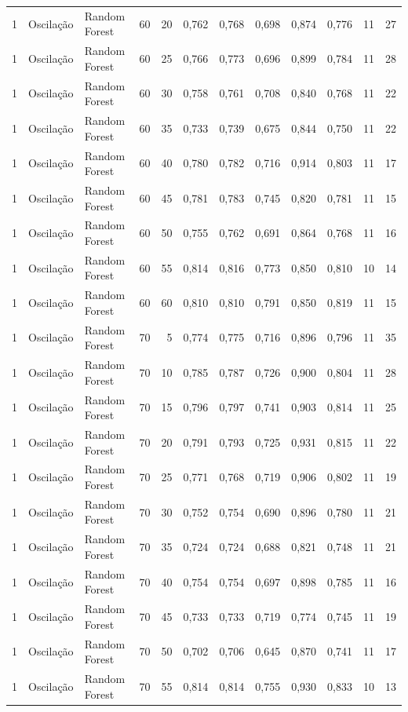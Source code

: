 \begin{longtable}{@{}rllrrrrrrrrr@{}}
1 & Oscilação & Random Forest & 60 & 20 & 0,762 & 0,768 & 0,698 & 0,874 & 0,776 & 11 & 27 \\
1 & Oscilação & Random Forest & 60 & 25 & 0,766 & 0,773 & 0,696 & 0,899 & 0,784 & 11 & 28 \\
1 & Oscilação & Random Forest & 60 & 30 & 0,758 & 0,761 & 0,708 & 0,840 & 0,768 & 11 & 22 \\
1 & Oscilação & Random Forest & 60 & 35 & 0,733 & 0,739 & 0,675 & 0,844 & 0,750 & 11 & 22 \\
1 & Oscilação & Random Forest & 60 & 40 & 0,780 & 0,782 & 0,716 & 0,914 & 0,803 & 11 & 17 \\
1 & Oscilação & Random Forest & 60 & 45 & 0,781 & 0,783 & 0,745 & 0,820 & 0,781 & 11 & 15 \\
1 & Oscilação & Random Forest & 60 & 50 & 0,755 & 0,762 & 0,691 & 0,864 & 0,768 & 11 & 16 \\
1 & Oscilação & Random Forest & 60 & 55 & 0,814 & 0,816 & 0,773 & 0,850 & 0,810 & 10 & 14 \\
1 & Oscilação & Random Forest & 60 & 60 & 0,810 & 0,810 & 0,791 & 0,850 & 0,819 & 11 & 15 \\
1 & Oscilação & Random Forest & 70 & 5 & 0,774 & 0,775 & 0,716 & 0,896 & 0,796 & 11 & 35 \\
1 & Oscilação & Random Forest & 70 & 10 & 0,785 & 0,787 & 0,726 & 0,900 & 0,804 & 11 & 28 \\
1 & Oscilação & Random Forest & 70 & 15 & 0,796 & 0,797 & 0,741 & 0,903 & 0,814 & 11 & 25 \\
1 & Oscilação & Random Forest & 70 & 20 & 0,791 & 0,793 & 0,725 & 0,931 & 0,815 & 11 & 22 \\
1 & Oscilação & Random Forest & 70 & 25 & 0,771 & 0,768 & 0,719 & 0,906 & 0,802 & 11 & 19 \\
1 & Oscilação & Random Forest & 70 & 30 & 0,752 & 0,754 & 0,690 & 0,896 & 0,780 & 11 & 21 \\
1 & Oscilação & Random Forest & 70 & 35 & 0,724 & 0,724 & 0,688 & 0,821 & 0,748 & 11 & 21 \\
1 & Oscilação & Random Forest & 70 & 40 & 0,754 & 0,754 & 0,697 & 0,898 & 0,785 & 11 & 16 \\
1 & Oscilação & Random Forest & 70 & 45 & 0,733 & 0,733 & 0,719 & 0,774 & 0,745 & 11 & 19 \\
1 & Oscilação & Random Forest & 70 & 50 & 0,702 & 0,706 & 0,645 & 0,870 & 0,741 & 11 & 17 \\
1 & Oscilação & Random Forest & 70 & 55 & 0,814 & 0,814 & 0,755 & 0,930 & 0,833 & 10 & 13 \\

\end{longtable}

